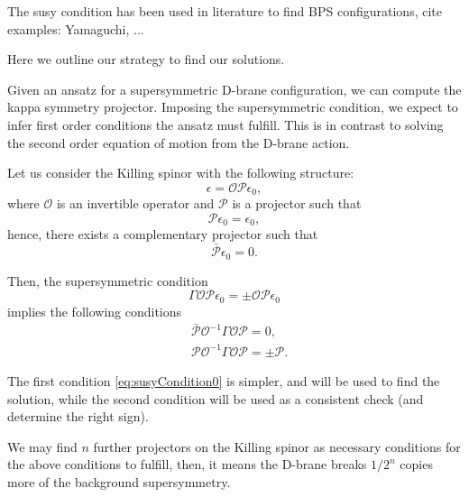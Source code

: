 The susy condition has been used in literature to find BPS configurations, cite examples: Yamaguchi, ...

Here we outline our strategy to find our solutions.

Given an ansatz for a supersymmetric D-brane configuration, we can compute the kappa symmetry projector. 
Imposing the supersymmetric condition, we expect to infer first order conditions the ansatz must fulfill. 
This is in contrast to solving the second order equation of motion from the D-brane action.


Let us consider the Killing spinor with the following structure:
\begin{equation}
\epsilon = \mathcal{O} \mathcal{P} \epsilon_0,
\end{equation}
where $\mathcal{O}$ is an invertible operator and $\mathcal{P}$ is a projector such that
\begin{equation}
    \mathcal{P} \epsilon_0 =  \epsilon_0,
\end{equation}
hence, there exists a complementary projector such that 
\begin{equation}
    \bar{\mathcal{P}} \epsilon_0 =  0.
\end{equation}

Then, the supersymmetric condition
\begin{equation}
 \Gamma \mathcal{O} \mathcal{P} \epsilon_0 = \pm \mathcal{O} \mathcal{P} \epsilon_0
\end{equation}
implies the following conditions
\begin{align}\label{eq:susyCondition0}
&\bar{\mathcal{P}} \mathcal{O}^{-1} \Gamma \mathcal{O} \mathcal{P}  = 0, \\
&\mathcal{P} \mathcal{O}^{-1} \Gamma \mathcal{O} \mathcal{P} = \pm \mathcal{P}.
\end{align}

The first condition \eqref{eq:susyCondition0} is simpler, and will be used to find the solution, while the second condition will be used as a consistent check (and determine the right sign).

We may find $n$ further projectors on the Killing spinor as necessary conditions for the above conditions to fulfill, then, it means the D-brane breaks $1/2^n$ copies more of the background supersymmetry. 
























